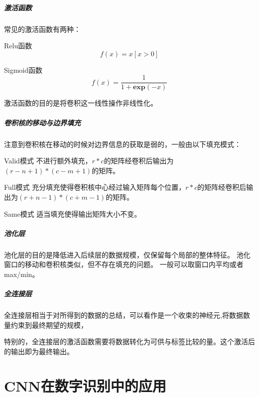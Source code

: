 \documentclass[
aspectratio=169,  %
]{ctexbeamer}
\begin{document}
	\begin{frame}
		\frametitle{激活函数}
		常见的激活函数有两种：
		\begin{block}{Relu函数}
		$$
		f(x)=x[x>0]
		$$
		\end{block}
		\begin{block}{Sigmoid函数}
			$$
			f(x)=\dfrac{1}{1+\mathbf{exp}(-x)}
			$$
		\end{block}
		激活函数的目的是将卷积这一线性操作非线性化。
	\end{frame}
	
	\begin{frame}
		\frametitle{卷积核的移动与边界填充}
		注意到卷积核在移动的时候对边界信息的获取是弱的，一般由以下填充模式：
		\begin{block}{Valid模式}
			不进行额外填充，$r*c$的矩阵经卷积后输出为$(r-n+1)*(c-m+1)$的矩阵。
		\end{block}
			\begin{block}{Full模式}
			充分填充使得卷积核中心经过输入矩阵每个位置，$r*c$的矩阵经卷积后输出为$(r+n-1)*(c+m-1)$的矩阵。
		\end{block}
			\begin{block}{Same模式}
			适当填充使得输出矩阵大小不变。
		\end{block}
	\end{frame}
	
	

		\begin{frame}
		\frametitle{池化层}
		池化层的目的是降低进入后续层的数据规模，仅保留每个局部的整体特征。
		池化窗口的移动和卷积核类似，但不存在填充的问题。
		一般可以取窗口内平均或者max/min。
	\end{frame}
	
	
	
	\begin{frame}
		\frametitle{全连接层}
		全连接层相当于对所得到的数据的总结，可以看作是一个收束的神经元,将数据数量约束到最终期望的规模，
		
		特别的，全连接层的激活函数需要将数据转化为可供与标签比较的量。这个激活后的输出即为最终输出。
	\end{frame}
	
	\part{CNN在数字识别中的应用}
	\AtBeginSection[]{
		\begin{frame}
			\sectionpage                        %
		\end{frame}
	}
\end{document}
